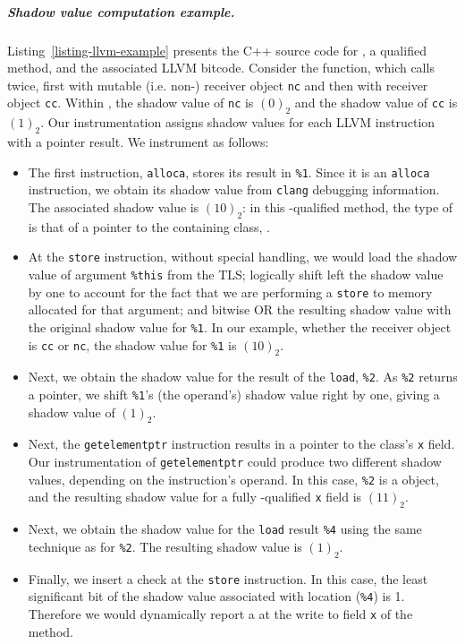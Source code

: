 \subparagraph*{Shadow value computation example.}

Listing~\ref{listing-llvm-example} presents the C++ source code for
, a \const{} qualified method, and the associated LLVM bitcode.
Consider the  function, which calls  twice, first with
mutable (i.e. non-\const{}) receiver object \texttt{nc} and then with \const{}
receiver object \texttt{cc}.
Within , the shadow value of \texttt{nc} is $(0)_2$ and the shadow
value of \texttt{cc} is $(1)_2$.
Our instrumentation assigns shadow values for each LLVM instruction with a
pointer result. We instrument  as follows:

\begin{itemize}
  \item The first instruction, \texttt{alloca}, stores its result in
        \texttt{\%1}.
        Since it is an \texttt{alloca} instruction, we obtain its shadow value
        from \texttt{clang} debugging information.
        The associated shadow value is $(10)_2$: in this \const{}-qualified
        method, the type of  is that of a \const{} pointer to the
        containing class, .
  \item At the \texttt{store} instruction, without special handling, we would
        load the shadow value of argument \texttt{\%this} from the TLS;
        logically shift left the shadow value by one to account for the fact
        that we are performing a \texttt{store} to memory allocated for that
        argument; and bitwise OR the resulting shadow value with the original
        shadow value for \texttt{\%1}.
        In our example, whether the receiver object is \texttt{cc} or
        \texttt{nc}, the shadow value for \texttt{\%1} is $(10)_2$.
  \item Next, we obtain the shadow value for the result of the \texttt{load},
        \texttt{\%2}.
        As \texttt{\%2} returns a pointer, we shift \texttt{\%1}'s (the
        operand's) shadow value right by one, giving a shadow value of $(1)_2$.
  \item Next, the \texttt{getelementptr} instruction results in a pointer to the
        class's \texttt{x} field.
        Our instrumentation of \texttt{getelementptr} could produce two
        different shadow values, depending on the instruction's operand.
        In this case, \texttt{\%2} is a \const{} object, and the resulting
        shadow value for a fully \const{}-qualified \texttt{x} field is
        $(11)_2$.
  \item Next, we obtain the shadow value for the \texttt{load} result
        \texttt{\%4} using the same technique as for \texttt{\%2}.
        The resulting shadow value is $(1)_2$.
  \item Finally, we insert a check at the \texttt{store} instruction.
        In this case, the least significant bit of the shadow value associated
        with location (\texttt{\%4}) is 1.
        Therefore we would dynamically report a \wtc{} at the write to field
        \texttt{x} of the \const{} method.
\end{itemize}

